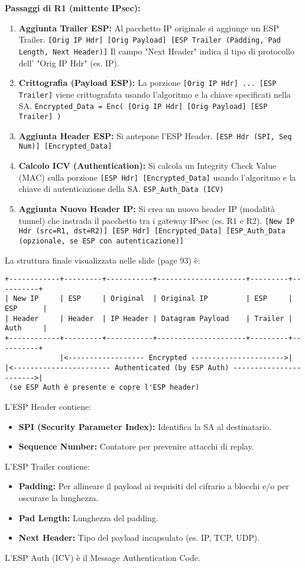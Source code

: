 \textbf{Passaggi di R1 (mittente IPsec):}
\begin{enumerate}
    \item \textbf{Aggiunta Trailer ESP:} Al pacchetto IP originale si aggiunge un ESP Trailer.
    \texttt{[Orig IP Hdr] [Orig Payload] [ESP Trailer (Padding, Pad Length, Next Header)]}
    Il campo "Next Header" indica il tipo di protocollo dell' "Orig IP Hdr" (es. IP).
    \item \textbf{Crittografia (Payload ESP):} La porzione \texttt{[Orig IP Hdr] ... [ESP Trailer]} viene crittografata usando l'algoritmo e la chiave specificati nella SA.
    \texttt{Encrypted\_Data = Enc( [Orig IP Hdr] [Orig Payload] [ESP Trailer] )}
    \item \textbf{Aggiunta Header ESP:} Si antepone l'ESP Header.
    \texttt{[ESP Hdr (SPI, Seq Num)] [Encrypted\_Data]}
    \item \textbf{Calcolo ICV (Authentication):} Si calcola un Integrity Check Value (MAC) sulla porzione \texttt{[ESP Hdr] [Encrypted\_Data]} usando l'algoritmo e la chiave di autenticazione della SA.
    \texttt{ESP\_Auth\_Data (ICV)}
    \item \textbf{Aggiunta Nuovo Header IP:} Si crea un nuovo header IP (modalità tunnel) che instrada il pacchetto tra i gateway IPsec (es. R1 e R2).
    \texttt{[New IP Hdr (src=R1, dst=R2)] [ESP Hdr] [Encrypted\_Data] [ESP\_Auth\_Data (opzionale, se ESP con autenticazione)]}
\end{enumerate}

La struttura finale visualizzata nelle slide (page 93) è:
\begin{verbatim}
+------------+---------+-----------+---------------------+---------+----------+
| New IP     | ESP     | Original  | Original IP         | ESP     | ESP      |
| Header     | Header  | IP Header | Datagram Payload    | Trailer | Auth     |
+------------+---------+-----------+---------------------+---------+----------+
             |<------------------ Encrypted ---------------------->|
|<----------------------- Authenticated (by ESP Auth) ----------------------->|
 (se ESP Auth è presente e copre l'ESP header)
\end{verbatim}
L'ESP Header contiene:
\begin{itemize}
    \item \textbf{SPI (Security Parameter Index):} Identifica la SA al destinatario.
    \item \textbf{Sequence Number:} Contatore per prevenire attacchi di replay.
\end{itemize}
L'ESP Trailer contiene:
\begin{itemize}
    \item \textbf{Padding:} Per allineare il payload ai requisiti del cifrario a blocchi e/o per oscurare la lunghezza.
    \item \textbf{Pad Length:} Lunghezza del padding.
    \item \textbf{Next Header:} Tipo del payload incapsulato (es. IP, TCP, UDP).
\end{itemize}
L'ESP Auth (ICV) è il Message Authentication Code.

